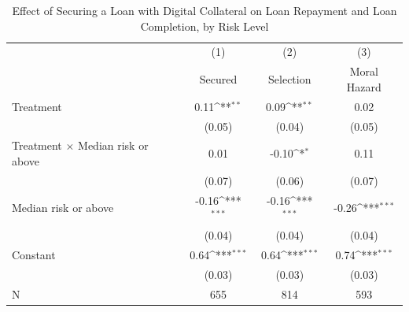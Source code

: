 \begin{table}[htbp]\centering
\def\sym#1{\ifmmode^{#1}\else\(^{#1}\)\fi}
\caption{Effect of Securing a Loan with Digital Collateral on Loan Repayment and Loan Completion, by Risk Level\label{LASMH\_repay\_riskinteract\_ITT}}
\begin{tabular}{l*{3}{c}}
\toprule
                    &\multicolumn{1}{c}{(1)}&\multicolumn{1}{c}{(2)}&\multicolumn{1}{c}{(3)}\\
                    &\multicolumn{1}{c}{Secured}&\multicolumn{1}{c}{Selection}&\multicolumn{1}{c}{Moral Hazard}\\
\midrule
Treatment           &        0.11\sym{**} &        0.09\sym{**} &        0.02         \\
                    &      (0.05)         &      (0.04)         &      (0.05)         \\\addlinespace
Treatment $\times$ Median risk or above&        0.01         &       -0.10\sym{*}  &        0.11         \\
                    &      (0.07)         &      (0.06)         &      (0.07)         \\\addlinespace
Median risk or above&       -0.16\sym{***}&       -0.16\sym{***}&       -0.26\sym{***}\\
                    &      (0.04)         &      (0.04)         &      (0.04)         \\\addlinespace
Constant            &        0.64\sym{***}&        0.64\sym{***}&        0.74\sym{***}\\
                    &      (0.03)         &      (0.03)         &      (0.03)         \\\addlinespace
\midrule
N                   &         655         &         814         &         593         \\
\bottomrule
\end{tabular}
\end{table}
